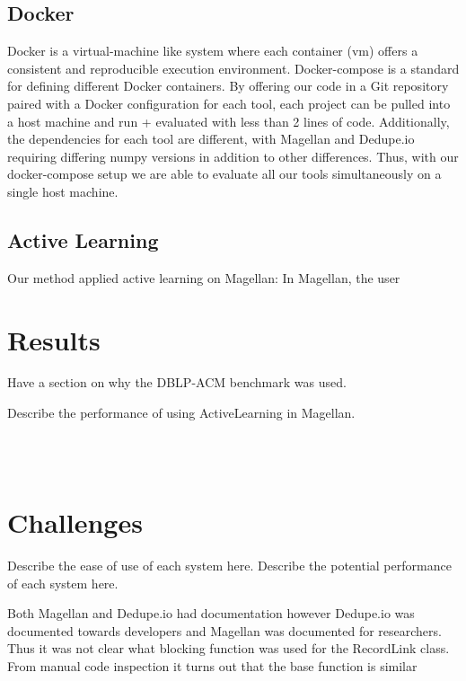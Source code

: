 \documentclass[letterpaper,twocolumn,10pt]{article}
\begin{document}
\subsection{Docker}
Docker is a virtual-machine like system where each container (vm) offers a consistent and reproducible execution environment. Docker-compose is a standard for defining different Docker containers. By offering our code in a Git repository paired with a Docker configuration for each tool, each project can be pulled into a host machine and run + evaluated with less than 2 lines of code. Additionally, the dependencies for each tool are different, with  Magellan and Dedupe.io requiring differing numpy versions in addition to other differences. Thus, with our docker-compose setup we are able to evaluate all our tools simultaneously on a single host machine. 


\subsection{Active Learning}
Our method applied active learning on Magellan: In Magellan, the user 

\section{Results}
Have a section on why the DBLP-ACM benchmark was used.

Describe the performance of using ActiveLearning in Magellan.


\noindent{}
\\\\

\section{Challenges}
Describe the ease of use of each system here.
Describe the potential performance of each system here.


Both Magellan and Dedupe.io had documentation however Dedupe.io was documented towards developers and Magellan was documented for researchers. Thus it was not clear what blocking function was used for the RecordLink class. From manual code inspection it turns out that the base function is similar 
\end{document}

